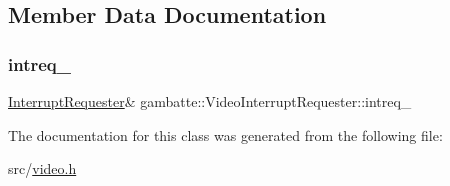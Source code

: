 \subsection{Member Data Documentation}
\mbox{\label{classgambatte_1_1VideoInterruptRequester_a021d316f4feb8756c5729741a1f685e9}} 
\subsubsection{\texorpdfstring{intreq\+\_\+}{intreq\_}}
{\footnotesize\ttfamily \hyperlink{classgambatte_1_1InterruptRequester}{Interrupt\+Requester}\& gambatte\+::\+Video\+Interrupt\+Requester\+::intreq\+\_\+\hspace{0.3cm}{\ttfamily [private]}}



The documentation for this class was generated from the following file\+:\begin{DoxyCompactItemize}
\item 
src/\hyperlink{video_8h}{video.\+h}\end{DoxyCompactItemize}
